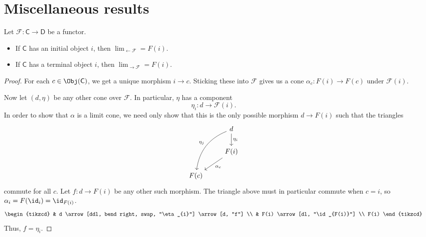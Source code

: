 \documentclass[notes.tex]{subfiles}
\begin{document}
\section{Miscellaneous results}
\label{sec:miscellaneous_results}

\begin{theorem}
  \label{thm:limit_over_category_with_initial_object_is_that}
  Let $\mathcal{F}\colon \mathsf{C} \to \mathsf{D}$ be a functor.

  \begin{itemize}
    \item If $\mathsf{C}$ has an initial object $i$, then $\lim_{\leftarrow \mathcal{F}} = F(i)$.

    \item If $\mathsf{C}$ has a terminal object $i$, then $\lim_{\rightarrow \mathcal{F}} = F(i)$.
  \end{itemize}
\end{theorem}
\begin{proof}
  For each $c \in \Obj(\mathsf{C})$, we get a unique morphism $i \to c$. Sticking these into $\mathcal{F}$ gives us a cone $\alpha_{c}\colon F(i) \to F(c)$ under $\mathcal{F}(i)$.

  Now let $(d, \eta)$ be any other cone over $\mathcal{F}$. In particular, $\eta$ has a component
  \begin{equation*}
    \eta_{i}\colon d \to \mathcal{F}(i).
  \end{equation*}
  In order to show that $\alpha$ is a limit cone, we need only show that this is the only possible morphism $d \to F(i)$ such that the triangles
  \begin{equation*}
    \begin{tikzcd}
      & d
      \arrow[ddl, bend right, swap, "\eta_{j}"]
      \arrow[d, "\eta_{i}"]
      \\
      & F(i)
      \arrow[dl, "\alpha_{c}"]
      \\
      F(c)
    \end{tikzcd}
  \end{equation*}
  commute for all $c$. Let $f\colon d \to F(i)$ be any other such morphism. The triangle above must in particular commute when $c = i$, so $\alpha_{i} = F(\id_{i}) = \id_{F(i)}$.
  \begin{equation*}
    \begin{tikzcd}
      & d
      \arrow[ddl, bend right, swap, "\eta_{i}"]
      \arrow[d, "f"]
      \\
      & F(i)
      \arrow[dl, "\id_{F(i)}"]
      \\
      F(i)
    \end{tikzcd}
  \end{equation*}
  Thus, $f = \eta_{i}$.
\end{proof}
\end{document}

